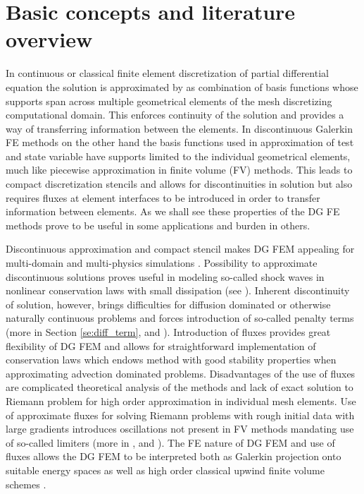 \section{Basic concepts and literature overview}
In continuous or classical finite element discretization of partial differential equation 
the solution is approximated by as combination of basis functions whose supports span 
across multiple geometrical elements of the mesh discretizing computational domain. This 
enforces continuity of the solution and provides a way of transferring information 
between the elements. In discontinuous Galerkin FE methods on the other hand the 
basis functions used in approximation of test and state variable have supports limited to 
the individual geometrical elements, much like piecewise approximation in finite volume 
(FV) methods. This leads to compact discretization stencils and allows for 
discontinuities in solution but also requires fluxes at element interfaces to be 
introduced in order to transfer information between elements. As we shall see these 
properties of the DG FE methods prove to be useful in some applications and burden in 
others.

Discontinuous approximation and compact stencil makes DG FEM appealing for 
multi-domain and multi-physics simulations \cite{DiPietro2012}.
Possibility to approximate discontinuous solutions proves useful in modeling so-called 
shock waves in nonlinear conservation laws with small dissipation \cite{Kucera}(see 
). Inherent discontinuity of solution, however, brings difficulties 
for diffusion 
dominated or otherwise naturally continuous problems and forces introduction of so-called 
penalty terms (more in Section \ref{se:diff_term}, \cite{Antonietti2013} and  
\cite{Kucera}). Introduction of fluxes provides great flexibility of DG FEM and allows 
for straightforward implementation of conservation laws which endows method with 
good stability properties when approximating advection dominated problems. 
Disadvantages of the use of fluxes are complicated theoretical analysis of the 
methods and lack of exact solution to Riemann problem for high order approximation in 
individual mesh elements. Use of approximate fluxes for solving Riemann problems with 
rough initial data with large gradients introduces oscillations not present in FV methods 
mandating use of so-called limiters (more in , \cite[Sec. 
3.2.4]{DiPietro2012} and \cite{Krivodonova2007}). The FE nature of DG FEM and use of 
fluxes allows the DG FEM to be interpreted both as Galerkin projection onto suitable 
energy spaces as well as high order classical upwind finite volume schemes 
\cite{Georgoulis2011}. 

